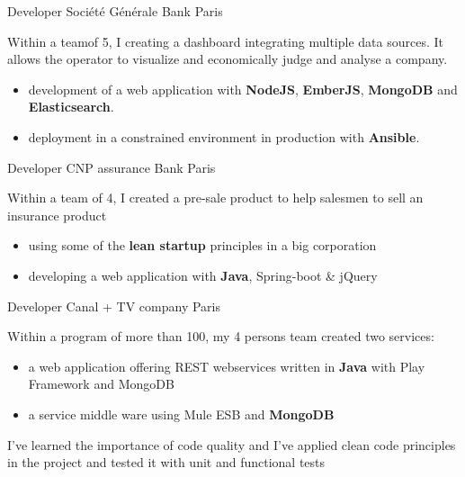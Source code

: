 \documentclass[11pt,a4paper]{moderncv}
\begin{document}
{Developer}
{Société Générale}
{Bank}
{Paris}
{
Within a teamof 5, I creating a dashboard  integrating multiple data sources. It allows the operator to visualize and economically judge and analyse a company.
\begin{itemize}
\item development of a web application with \textbf{NodeJS}, \textbf{EmberJS}, \textbf{MongoDB} and \textbf{Elasticsearch}.
\item deployment in a constrained environment in production with \textbf{Ansible}.
\end{itemize}
\vspace{5mm}
}

{Developer}
{CNP assurance}
{Bank}
{Paris}
{
Within a team of 4, I created a pre-sale product to help salesmen to sell an insurance product
\begin{itemize}
\item using some of the \textbf{lean startup} principles in a big corporation
\item developing a web application with \textbf{Java}, Spring-boot \& jQuery
\end{itemize}
\vspace{5mm}
}

{Developer}
{Canal + }
{TV company}
{Paris}
{
Within a program of more than 100, my 4 persons team created two services:
\begin{itemize}
\item a web application offering REST webservices written in \textbf{Java} with Play Framework and MongoDB
\item a service middle ware using Mule ESB and \textbf{MongoDB}
\end{itemize}
I've learned the importance of code quality and I've applied clean code principles in the project and tested it with unit and functional tests
\vspace{5mm}
}
\end{document}

